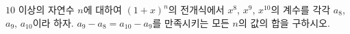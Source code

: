 $10$ 이상의 자연수 $n$에 대하여 $(1+x)^n$의 전개식에서 $x^8$, $x^9$, $x^{10}$의 계수를 각각 $a_8$, $a_9$, $a_{10}$이라 하자. $a_9-a_8=a_{10}-a_9$를 만족시키는 모든 $n$의 값의 합을 구하시오.

